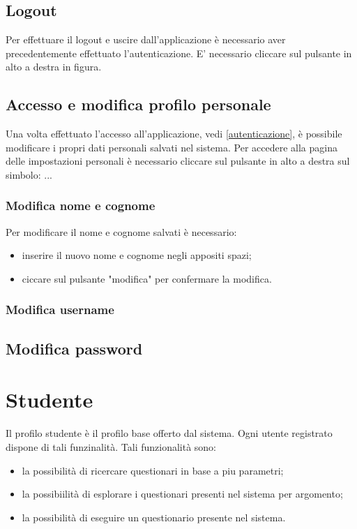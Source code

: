 \documentclass[12pt,a4paper]{article}
\begin{document}
	\subsection{Logout}
	Per effettuare il logout e uscire dall'applicazione è necessario aver precedentemente effettuato l'autenticazione.
	E' necessario cliccare sul pulsante in alto a destra in figura.
		\begin{comment}
		\begin{figure}[h]
		
		\centering
		\texttt{[image: ]}
		\caption{}
		\label{Pulsante di logout}
		\end{figure}
		
		\end{comment}
	\subsection{Accesso e modifica profilo personale}
	Una volta effettuato l'accesso all'applicazione, vedi \ref{autenticazione}, è possibile modificare i propri dati personali salvati nel sistema.
	Per accedere alla pagina delle impostazioni personali è necessario cliccare sul pulsante in alto a destra sul simbolo: ...
	
	\subsubsection{Modifica nome e cognome}
	Per modificare il nome e cognome salvati è necessario:
	\begin{itemize}
		\item inserire il nuovo nome e cognome negli appositi spazi;
		\item ciccare sul pulsante "modifica" per confermare la modifica.
	\end{itemize}
	\subsubsection{Modifica username}
	
	\subsection{Modifica password}

	\section{Studente}\label{studente}
	Il profilo studente è il profilo  base offerto dal sistema. Ogni utente registrato dispone di tali funzinalità. Tali funzionalità sono:
	\begin{itemize}
		\item la possibilità di ricercare questionari in base a piu parametri;
		\item la possibiilità di esplorare i questionari presenti nel sistema per argomento;
		\item la possibilità di eseguire un questionario presente nel sistema.
	\end{itemize}
\end{document}
